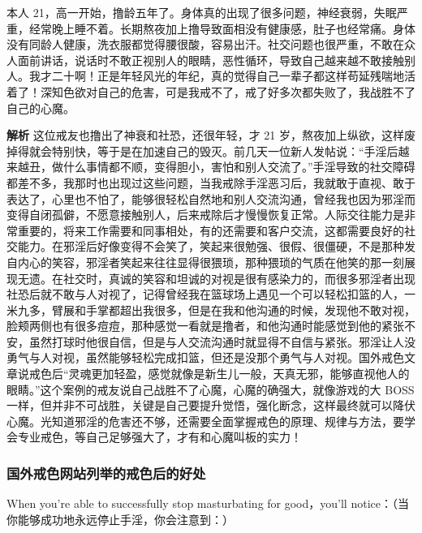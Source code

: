\begin{case}
    本人 21，高一开始，撸龄五年了。身体真的出现了很多问题，神经衰弱，失眠严重，经常晚上睡不着。长期熬夜加上撸导致面相没有健康感，肚子也经常痛。身体没有同龄人健康，洗衣服都觉得腰很酸，容易出汗。社交问题也很严重，不敢在众人面前讲话，说话时不敢正视别人的眼睛，恶性循环，导致自己越来越不敢接触别人。我才二十啊！正是年轻风光的年纪，真的觉得自己一辈子都这样苟延残喘地活着了！深知色欲对自己的危害，可是我戒不了，戒了好多次都失败了，我战胜不了自己的心魔。

    \textbf{解析} 这位戒友也撸出了神衰和社恐，还很年轻，才 21 岁，熬夜加上纵欲，这样废掉得就会特别快，等于是在加速自己的毁灭。前几天一位新人发帖说：“手淫后越来越丑，做什么事情都不顺，变得胆小，害怕和别人交流了。”手淫导致的社交障碍都差不多，我那时也出现过这些问题，当我戒除手淫恶习后，我就敢于直视、敢于表达了，心里也不怕了，能够很轻松自然地和别人交流沟通，曾经我也因为邪淫而变得自闭孤僻，不愿意接触别人，后来戒除后才慢慢恢复正常。人际交往能力是非常重要的，将来工作需要和同事相处，有的还需要和客户交流，这都需要良好的社交能力。在邪淫后好像变得不会笑了，笑起来很勉强、很假、很僵硬，不是那种发自内心的笑容，邪淫者笑起来往往显得很猥琐，那种猥琐的气质在他笑的那一刻展现无遗。在社交时，真诚的笑容和坦诚的对视是很有感染力的，而很多邪淫者出现社恐后就不敢与人对视了，记得曾经我在篮球场上遇见一个可以轻松扣篮的人，一米九多，臂展和手掌都超出我很多，但是在我和他沟通的时候，发现他不敢对视，脸颊两侧也有很多痘痘，那种感觉一看就是撸者，和他沟通时能感觉到他的紧张不安，虽然打球时他很自信，但是与人交流沟通时就显得不自信与紧张。邪淫让人没勇气与人对视，虽然能够轻松完成扣篮，但还是没那个勇气与人对视。国外戒色文章说戒色后“灵魂更加轻盈，感觉就像是新生儿一般，天真无邪，能够直视他人的眼睛。”这个案例的戒友说自己战胜不了心魔，心魔的确强大，就像游戏的大 BOSS 一样，但并非不可战胜，关键是自己要提升觉悟，强化断念，这样最终就可以降伏心魔。光知道邪淫的危害还不够，还需要全面掌握戒色的原理、规律与方法，要学会专业戒色，等自己足够强大了，才有和心魔叫板的实力！
\end{case}

\subsubsection{国外戒色网站列举的戒色后的好处}

When you're able to successfully stop masturbating for good，you'll notice：（当你能够成功地永远停止手淫，你会注意到：）

